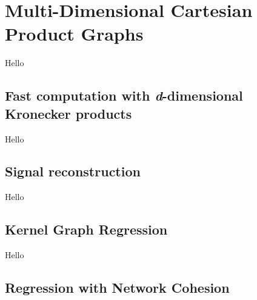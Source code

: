

\chapter{Multi-Dimensional Cartesian Product Graphs}

\label{chap:nd_gsp}

Hello

\section{Fast computation with \textit{d}-dimensional Kronecker products}

Hello

\section{Signal reconstruction}

Hello

\section{Kernel Graph Regression}

Hello

\section{Regression with Network Cohesion}